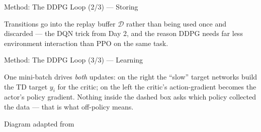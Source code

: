 \begin{frame}{Method: The DDPG Loop (2/3) --- Storing}
\vspace{0.2em}
\centering
{}

\vspace{0.5em}
\begin{flushleft}\footnotesize
Transitions go into the replay buffer $\mathcal{D}$ rather than being used once and discarded --- the DQN trick from Day 2, and the reason DDPG needs far less environment interaction than PPO on the same task.
\end{flushleft}
\end{frame}

\begin{frame}{Method: The DDPG Loop (3/3) --- Learning}
\vspace{0.2em}
\centering
{}

\vspace{0.3em}
\begin{flushleft}\footnotesize
One mini-batch drives \emph{both} updates: on the right the ``slow'' target networks build the TD target $y_i$ for the critic; on the left the critic's action-gradient becomes the actor's policy gradient. Nothing inside the dashed box asks which policy collected the data --- that is what off-policy means.
\end{flushleft}
\vspace{-0.4em}
\begin{flushright}\tiny Diagram adapted from \end{flushright}
\end{frame}

%
\newcommand{\hlif}[3]{\ifnum#1=#2 \hlbox{red}{#3}\else\hlbox{none}{#3}\fi}

